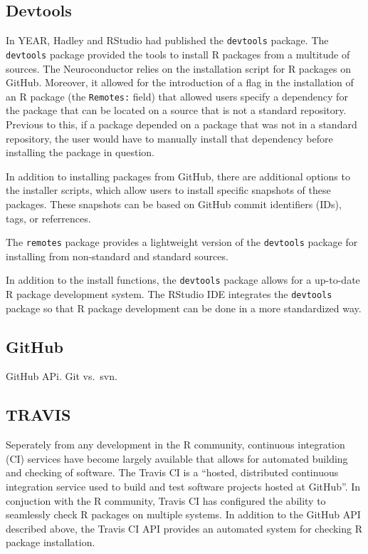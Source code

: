 \documentclass[]{elsarticle} %
\begin{document}
\subsection{Devtools}\label{devtools}

In YEAR, Hadley and RStudio had published the \texttt{devtools} package.
The \texttt{devtools} package provided the tools to install R packages
from a multitude of sources. The Neuroconductor relies on the
installation script for R packages on GitHub. Moreover, it allowed for
the introduction of a flag in the installation of an R package (the
\texttt{Remotes:} field) that allowed users specify a dependency for the
package that can be located on a source that is not a standard
repository. Previous to this, if a package depended on a package that
was not in a standard repository, the user would have to manually
install that dependency before installing the package in question.

In addition to installing packages from GitHub, there are additional
options to the installer scripts, which allow users to install specific
snapshots of these packages. These snapshots can be based on GitHub
commit identifiers (IDs), tags, or referrences.

The \texttt{remotes} package provides a lightweight version of the
\texttt{devtools} package for installing from non-standard and standard
sources.

In addition to the install functions, the \texttt{devtools} package
allows for a up-to-date R package development system. The RStudio IDE
integrates the \texttt{devtools} package so that R package development
can be done in a more standardized way.

\subsection{GitHub}\label{github}

GitHub APi. Git vs.~svn.

\subsection{TRAVIS}\label{travis}

Seperately from any development in the R community, continuous
integration (CI) services have become largely available that allows for
automated building and checking of software. The Travis CI is a
``hosted, distributed continuous integration service used to build and
test software projects hosted at GitHub''. In conjuction with the R
community, Travis CI has configured the ability to seamlessly check R
packages on multiple systems. In addition to the GitHub API described
above, the Travis CI API provides an automated system for checking R
package installation.
\end{document}
